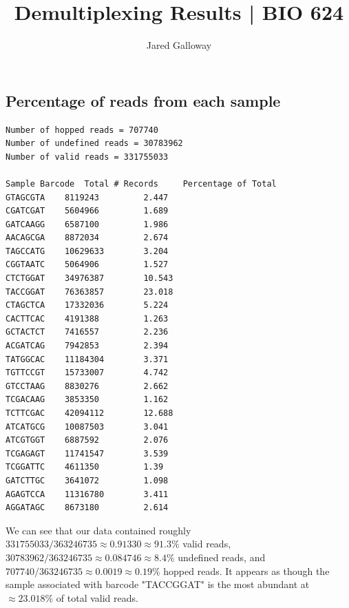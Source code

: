 \documentclass{article}
\title{Demultiplexing Results | BIO 624}
\author{Jared Galloway}
\date{}                                           %
\begin{document}
\maketitle

\newpage

\subsection*{Percentage of reads from each sample}
\begin{verbatim}
Number of hopped reads = 707740
Number of undefined reads = 30783962
Number of valid reads = 331755033

Sample Barcode	Total # Records	    Percentage of Total
GTAGCGTA	8119243	        2.447
CGATCGAT	5604966	        1.689
GATCAAGG	6587100	        1.986
AACAGCGA	8872034	        2.674
TAGCCATG	10629633	    3.204
CGGTAATC	5064906	        1.527
CTCTGGAT	34976387	    10.543
TACCGGAT	76363857	    23.018
CTAGCTCA	17332036	    5.224
CACTTCAC	4191388	        1.263
GCTACTCT	7416557	        2.236
ACGATCAG	7942853	        2.394
TATGGCAC	11184304	    3.371
TGTTCCGT	15733007	    4.742
GTCCTAAG	8830276	        2.662
TCGACAAG	3853350	        1.162
TCTTCGAC	42094112	    12.688
ATCATGCG	10087503	    3.041
ATCGTGGT	6887592	        2.076
TCGAGAGT	11741547	    3.539
TCGGATTC	4611350	        1.39
GATCTTGC	3641072	        1.098
AGAGTCCA	11316780	    3.411
AGGATAGC	8673180	        2.614
\end{verbatim}

We can see that our data contained roughly 
$331755033 / 363246735 \approx 0.91330 \approx 91.3\%$ valid reads, 
$30783962 / 363246735 \approx 0.084746 \approx 8.4\%$ undefined reads, and 
$707740 / 363246735 \approx 0.0019 \approx 0.19\%$ hopped reads. 
It appears as though the sample associated with barcode "TACCGGAT" is the most abundant at $\approx 23.018\%$ of total valid reads.

\begin{figure}[h!!]
\end{figure}

\newpage

	
\end{document}
